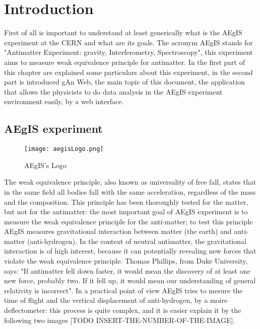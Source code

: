
\chapter{Introduction} %

\label{Chapter1} %


First of all is important to understand at least generically what is the AEgIS experiment at the CERN and what are its goals. The acronym AEgIS stands for "Antimatter Experiment: gravity, Interferometry, Spectroscopy", this experiment aims to measure weak equivalence principle for antimatter. In the first part of this chapter are explained some particulars about this experiment, in the second part is introduced gAn Web, the main topic of this document, the application that allows the physicists to do data analysis in the AEgIS experiment environment easily, by a web interface. 

\section{AEgIS experiment}


\begin{figure}[H]
\centering
\texttt{[image: aegisLogo.png]} 
\caption{AEgIS's Logo}
\end{figure}

The weak equivalence principle, also known as universality of free fall, states that in the same field all bodies fall with the same acceleration, regardless of the mass and the composition. This principle has been thoroughly tested for the matter, but not for the antimatter: the most important goal of AEgIS experiment is to measure the weak equivalence principle for the anti-matter; to test this principle AEgIS measures gravitational interaction between matter (the earth) and anti-matter (anti-hydrogen). In the context of neutral antimatter, the gravitational interaction is of high interest, because it can potentially revealing new forces that violate the weak equivalence principle. Thomas Phillips, from Duke University, says: "If antimatter fell down faster, it would mean the discovery of at least one new force, probably two. If it fell up, it would mean our understanding of general relativity is incorrect". In a practical point of view AEgIS tries to mesure the time of flight and the vertical displacement of anti-hydrogen, by a moire deflectometer: this process is quite complex, and it is easier explain it by the following two images [TODO INSERT-THE-NUMBER-OF-THE-IMAGE].

